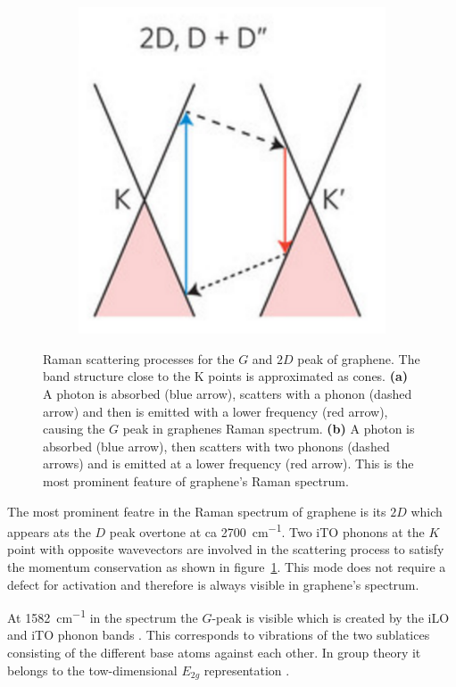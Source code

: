 \begin{figure}[!h]
\begin{subfigure}{0.2\textwidth}
  \end{subfigure}
  ~
  \begin{subfigure}{0.45\textwidth}
    \includegraphics[width=\textwidth]{./images/2d-mode.png}
  \end{subfigure}
  \caption{Raman scattering processes for the $G$ and $2D$ peak of graphene. The band structure close to the K points is approximated as cones. \textbf{(a)} A photon is absorbed (blue arrow), scatters with a phonon (dashed arrow) and then is emitted with a lower frequency (red arrow), causing the $G$ peak in graphenes Raman spectrum. \textbf{(b)} A photon is absorbed (blue arrow), then scatters with two phonons (dashed arrows) and is emitted at a lower frequency (red arrow). This is the most prominent feature of graphene's Raman spectrum. }
  \label{fig:raman-modes}
\end{figure}

The most prominent featre in the Raman spectrum of graphene is its $2D$ which appears ats the $D$ peak overtone at ca \SI{2700}{cm^{-1}}. Two iTO phonons at the $K$ point with opposite wavevectors are involved in the scattering process to satisfy the momentum conservation as shown in figure~\ref{fig:raman-modes}. This mode does not require a defect for activation and therefore is always visible in graphene's spectrum.

At \SI{1582}{cm^{-1}} in the spectrum the $G$-peak is visible which is created by the iLO and iTO phonon bands \mcite. This corresponds to vibrations of the two sublatices consisting of the different base atoms against each other. In group theory it belongs to the tow-dimensional $E_{2g}$ representation \mcite.
